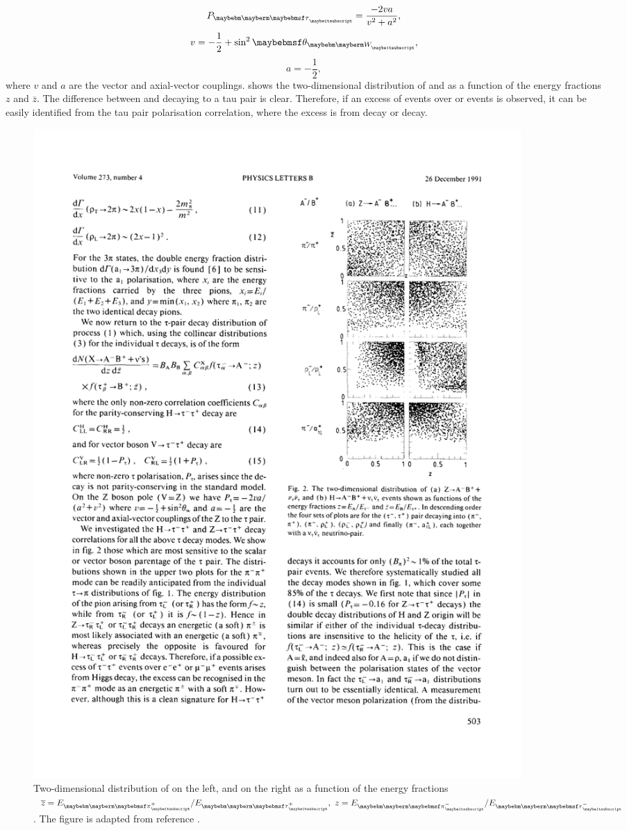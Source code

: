 \begin{equation}
P_{\Ptau} = \frac{-2va}{v^2 + a^2},
\end{equation}
\begin{equation}
v = -\frac{1}{2} + \sin^2{\theta_{\PW}},
\end{equation}
\begin{equation}
a = -\frac{1}{2},
\end{equation}
where $v$ and $a$ are the vector and axial-vector \ZTauTau couplings.  shows the two-dimensional distribution of \ZToTauTau and \HiggsToTauTau as a function of the energy fractions $z$ and $\overline{z}$. The difference between \PZ and \PHiggs decaying to a tau pair is clear. Therefore, if an excess of \TauTau events over \ee or \MuMu events is observed, it can be easily identified from the tau pair polarisation correlation, where the excess is from \PHiggs decay or \PZ decay. 

\begin{figure}[htbp]
\centering %
\includegraphics[width=0.9\textwidth]{theory/TauPairCorrelation}
  
\caption[Two-dimensional distribution of \ZToTauTau and \HiggsToTauTau.]
{Two-dimensional distribution of \ZToTauTau on the left, and \HiggsToTauTau on the right as a function of the energy fractions $\overline{z} = {E_{\Ppiplus}}/{E_{\APtauon}},\ z = {E_{\Ppiminus}}/{E_{\Ptauon}}$. The figure is adapted from reference \cite{Tsai:1971vv}.}
\label{fig:theoryTauPairCorrelation}
\end{figure}